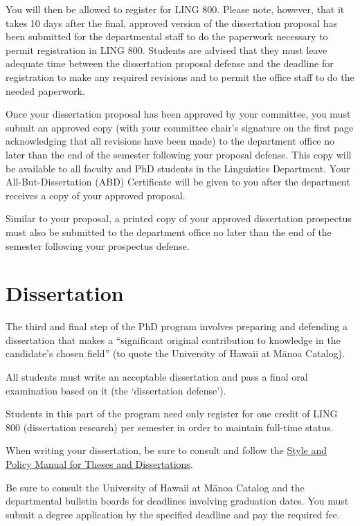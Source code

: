 \documentclass[
]{book}
\begin{document}
You will then be allowed to register for LING 800. Please note, however, that it takes 10 days after the final, approved version of the dissertation proposal has been submitted for the departmental staff to do the paperwork necessary to permit registration in LING 800. Students are advised that they must leave adequate time between the dissertation proposal defense and the deadline for registration to make any required revisions and to permit the office staff to do the needed paperwork.

Once your dissertation proposal has been approved by your committee, you must submit an approved copy (with your committee chair's signature on the first page acknowledging that all revisions have been made) to the department office no later than the end of the semester following your proposal defense. This copy will be available to all faculty and PhD students in the Linguistics Department. Your All-But-Dissertation (ABD) Certificate will be given to you after the department receives a copy of your approved proposal.

Similar to your proposal, a printed copy of your approved dissertation prospectus must also be submitted to the department office no later than the end of the semester following your prospectus defense.

\hypertarget{dissertation}{%
\chapter{Dissertation}\label{dissertation}}

The third and final step of the PhD program involves preparing and defending a dissertation that makes a ``significant original contribution to knowledge in the candidate's chosen field'' (to quote the University of Hawai\textquotesingle i at Mānoa Catalog).

All students must write an acceptable dissertation and pass a final oral examination based on it (the `dissertation defense').

Students in this part of the program need only register for one credit of LING 800 (dissertation research) per semester in order to maintain full-time status.

When writing your dissertation, be sure to consult and follow the \href{http://manoa.hawaii.edu/graduate/sites/manoa.hawaii.edu.graduate/files/documents/misc/tdstylepolicy_e.pdf}{Style and Policy Manual for Theses and Dissertations}.

Be sure to consult the University of Hawai\textquotesingle i at Mānoa Catalog and the departmental bulletin boards for deadlines involving graduation dates. You must submit a degree application by the specified deadline and pay the required fee.
\end{document}
